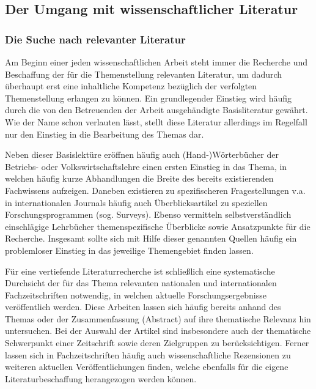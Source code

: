 \documentclass[a4paper, 12pt]{article}
\begin{document}
\subsection{Der Umgang mit wissenschaftlicher Literatur} \label{Umgang}

\subsubsection{Die Suche nach relevanter Literatur}

Am Beginn einer jeden wissenschaftlichen Arbeit steht immer die Recherche und
Beschaffung der f\"{u}r die Themenstellung relevanten Literatur, um dadurch \"{u}berhaupt
erst eine inhaltliche Kompetenz bez\"{u}glich der verfolgten Themenstellung erlangen zu
k\"{o}nnen. Ein grundlegender Einstieg wird h\"{a}ufig durch die von den Betreuenden der
Arbeit ausgeh\"{a}ndigte Basisliteratur gew\"{a}hrt. Wie der Name schon verlauten l\"{a}sst,
stellt diese Literatur allerdings im Regelfall nur den Einstieg in die Bearbeitung
des Themas dar.

Neben dieser Basislekt\"{u}re er\"{o}ffnen h\"{a}ufig auch (Hand-)W\"{o}rterb\"{u}cher der Betriebs-
oder Volkswirtschaftslehre einen ersten Einstieg in das Thema, in welchen h\"{a}ufig
kurze Abhandlungen die Breite des bereits existierenden Fachwissens aufzeigen.
Daneben existieren zu spezifischeren Fragestellungen v.a. in internationalen
Journals h\"{a}ufig auch \"{U}berblicksartikel zu speziellen Forschungsprogrammen (sog.
\glqq Surveys\grqq). Ebenso vermitteln selbstverst\"{a}ndlich einschl\"{a}gige Lehrb\"{u}cher
themenspezifische \"{U}berblicke sowie Ansatzpunkte f\"{u}r die Recherche. Insgesamt sollte
sich mit Hilfe dieser genannten Quellen h\"{a}ufig ein problemloser Einstieg in das
jeweilige Themengebiet finden lassen.

F\"{u}r eine vertiefende Literaturrecherche ist schlie\ss lich eine systematische
Durchsicht der f\"{u}r das Thema relevanten nationalen und internationalen
Fachzeitschriften notwendig, in welchen aktuelle Forschungsergebnisse ver\"{o}ffentlich
werden. Diese Arbeiten lassen sich h\"{a}ufig bereits anhand des Themas oder der
Zusammenfassung (Abstract) auf ihre thematische Relevanz hin untersuchen. Bei der
Auswahl der Artikel sind insbesondere auch der thematische Schwerpunkt einer
Zeitschrift sowie deren Zielgruppen zu ber\"{u}cksichtigen. Ferner lassen sich in
Fachzeitschriften h\"{a}ufig auch wissenschaftliche Rezensionen zu weiteren aktuellen
Ver\"{o}ffentlichungen finden, welche ebenfalls f\"{u}r die eigene Literaturbeschaffung
herangezogen werden k\"{o}nnen.
\end{document}
